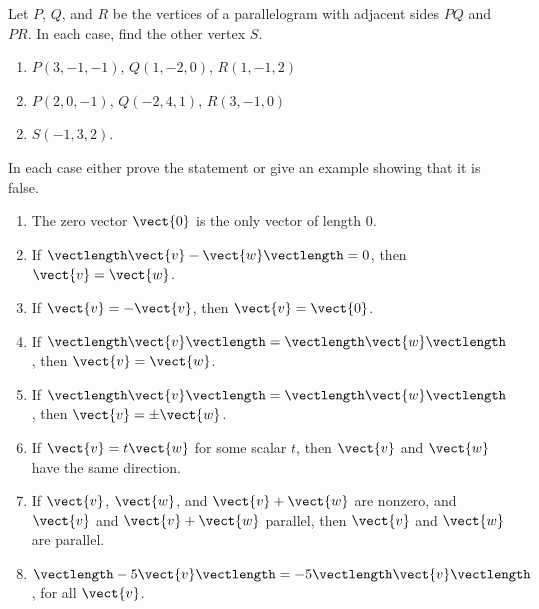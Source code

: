 \begin{multicols}{2}
\begin{ex}
Let $P$, $Q$, and $R$ be the vertices of a parallelogram with adjacent sides $PQ$ and $PR$. In each case, find the other vertex $S$.

\begin{enumerate}[label={\alph*.}]
\item $P(3, -1, -1)$, $Q(1, -2, 0)$, $R(1, -1, 2)$

\item $P(2, 0, -1)$, $Q(-2, 4, 1)$, $R(3, -1, 0)$

\end{enumerate}
\begin{sol}
\begin{enumerate}[label={\alph*.}]
\setcounter{enumi}{1}
\item  $S(-1, 3, 2)$.

\end{enumerate}
\end{sol}
\end{ex}

\begin{ex}
In each case either prove the statement or give an example showing that it is false.


\begin{enumerate}[label={\alph*.}]
\item The zero vector $\vect{0}$ is the only vector of length 0.

\item If $\vectlength\vect{v} - \vect{w}\vectlength = 0$, then $\vect{v} = \vect{w}$.

\item If $\vect{v} = -\vect{v}$, then $\vect{v} = \vect{0}$.

\item If $\vectlength\vect{v}\vectlength = \vectlength\vect{w}\vectlength$, then $\vect{v} = \vect{w}$.

\item If $\vectlength\vect{v}\vectlength = \vectlength\vect{w}\vectlength$, then $\vect{v} = \pm\vect{w}$.

\item If $\vect{v} = t\vect{w}$ for some scalar $t$, then $\vect{v}$ and $\vect{w}$ have the same direction.

\item If $\vect{v}$, $\vect{w}$, and $\vect{v} + \vect{w}$ are nonzero, and $\vect{v}$ and $\vect{v} + \vect{w}$ parallel, then $\vect{v}$ and $\vect{w}$ are parallel.

\item $\vectlength-5\vect{v}\vectlength = -5\vectlength\vect{v}\vectlength$, for all $\vect{v}$.


\end{enumerate}
\end{ex}
\end{multicols}
